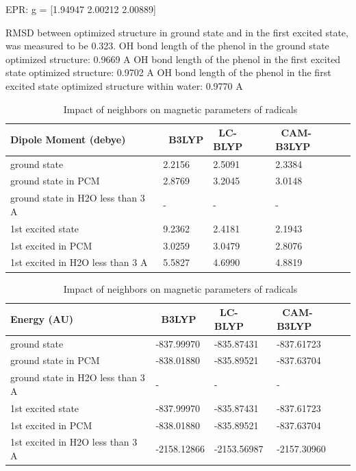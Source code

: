 \documentclass[]{interact}
\theoremstyle{plain}%
\theoremstyle{definition}
\theoremstyle{remark}
\begin{document}
EPR: g = [1.94947   2.00212   2.00889]
 
 RMSD between optimized structure in ground state and in the first excited state, was measured to be 0.323.
 OH bond length of the phenol in the ground state optimized structure: 0.9669 A
 OH bond length of the phenol in the first excited state optimized structure: 0.9702 A
 OH bond length of the phenol in the first excited state optimized structure within water: 0.9770 A
 

\begin{table}
	\small
	\caption{\ Impact of neighbors on magnetic parameters of radicals}
	\label{Dipole}
	\begin{tabular*}{\textwidth}{@{\extracolsep{\fill}}llll}
		\hline
		Dipole Moment (debye) & \ B3LYP  & \ LC-BLYP & \ CAM-B3LYP  \\
		\hline
		ground state   & 2.2156  &  2.5091  &  2.3384  \\
		ground state in PCM & 2.8769  &  3.2045  &  3.0148  \\
		ground state in H2O less than 3 A   & -  &  -  &  - \\
		1st excited state & 9.2362  &  2.4181  &  2.1943 \\
		1st excited in PCM & 3.0259  &   3.0479  &  2.8076 \\
		1st excited in H2O less than 3 A   & 5.5827  &  4.6990  &  4.8819 \\
		\hline
	\end{tabular*}
\end{table}


\begin{table}
	\small
	\caption{\ Impact of neighbors on magnetic parameters of radicals}
	\label{SCFEnergy}
	\begin{tabular*}{\textwidth}{@{\extracolsep{\fill}}llll}
		\hline
		Energy (AU) & \ B3LYP  & \ LC-BLYP & \ CAM-B3LYP  \\
		\hline
		ground state   &  -837.99970  &  -835.87431  &  -837.61723 \\
		ground state in PCM & -838.01880  &  -835.89521  &  -837.63704  \\
		ground state in H2O less than 3 A   & -  &  -  &  - \\
		1st excited state & -837.99970  &  -835.87431  &  -837.61723\\
		1st excited in PCM & -838.01880 &   -835.89521  &  -837.63704 \\
		1st excited in H2O less than 3 A   & -2158.12866  &  -2153.56987  &  -2157.30960 \\
		\hline
	\end{tabular*}
\end{table}
\end{document}
